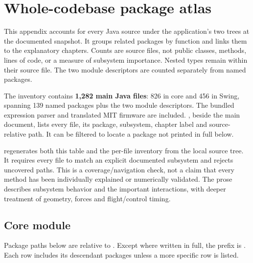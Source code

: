 \chapter{Whole-codebase package atlas}\label{app:packages}

This appendix accounts for every Java source under the application's two  trees at the documented snapshot. It groups related packages by function and links them to the explanatory chapters. Counts are source files, not public classes, methods, lines of code, or a measure of subsystem importance. Nested types remain within their source file. The two module descriptors are counted separately from named packages.

The inventory contains \textbf{1,282 main Java files}: 826 in core and 456 in Swing, spanning 139 named packages plus the two module descriptors. The bundled expression parser and translated MIT firmware are included. , beside the main document, lists every file, its package, subsystem, chapter label and source-relative path. It can be filtered to locate a package not printed in full below.

 regenerates both this table and the per-file inventory from the local source tree. It requires every file to match an explicit documented subsystem and rejects uncovered paths. This is a coverage/navigation check, not a claim that every method has been individually explained or numerically validated. The prose describes subsystem behavior and the important interactions, with deeper treatment of geometry, forces and flight/control timing.


\section{Core module}

Package paths below are relative to . Except where written in full, the prefix is . Each row includes its descendant packages unless a more specific row is listed.

